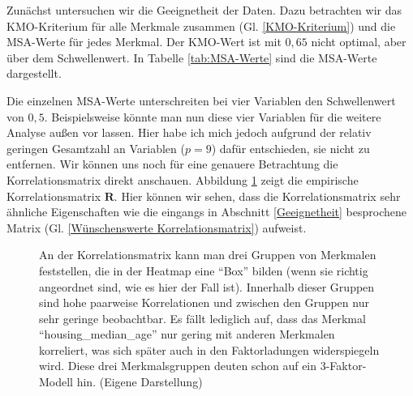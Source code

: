 \documentclass[11pt]{scrartcl}
\begin{document}
	Zunächst untersuchen wir die Geeignetheit der Daten. Dazu betrachten wir das KMO-Kriterium für alle Merkmale zusammen (Gl. \ref{KMO-Kriterium}) und die MSA-Werte für jedes Merkmal. Der KMO-Wert ist mit $0{,}65$ nicht optimal, aber über dem Schwellenwert. In Tabelle \ref{tab:MSA-Werte} sind die MSA-Werte dargestellt.
	\begin{table}[h]
		\centering
		\caption{MSA-Werte für alle neun metrischen Merkmale}
		\label{tab:MSA-Werte}
	\end{table}

	Die einzelnen MSA-Werte
	unterschreiten bei vier Variablen den Schwellenwert von $0{,}5$. Beispielsweise könnte man nun
	diese vier Variablen für die weitere Analyse außen vor lassen. Hier habe ich mich jedoch aufgrund
	der relativ geringen Gesamtzahl an Variablen ($p=9$) dafür entschieden, sie nicht zu entfernen.
	Wir können uns noch für eine genauere Betrachtung die Korrelationsmatrix direkt anschauen.
	Abbildung \ref{fig:Korrelations-Heatmap} zeigt die empirische Korrelationsmatrix $\mathbf{R}$. Hier können
	wir sehen, dass die Korrelationsmatrix sehr ähnliche Eigenschaften wie die eingangs in Abschnitt \ref{Geeignetheit} besprochene Matrix (Gl. \ref{Wünschenswerte Korrelationsmatrix}) aufweist.
	
	\begin{figure}[h]
		\centering
		
		\caption[Korrelationsmatrix als Heatmap]{An der Korrelationsmatrix kann man drei Gruppen von Merkmalen
			feststellen, die in der Heatmap eine \enquote{Box} bilden (wenn sie richtig angeordnet sind, wie es hier der Fall ist). Innerhalb dieser Gruppen sind hohe paarweise Korrelationen und zwischen den Gruppen nur sehr geringe beobachtbar. Es fällt lediglich
			auf, dass das Merkmal \enquote{housing\_median\_age} nur gering mit anderen Merkmalen korreliert, was sich später auch in den Faktorladungen widerspiegeln wird. Diese drei Merkmalsgruppen deuten schon auf ein 3-Faktor-Modell hin.
		    (Eigene Darstellung)}
		\label{fig:Korrelations-Heatmap}
	\end{figure}
	
\end{document}
